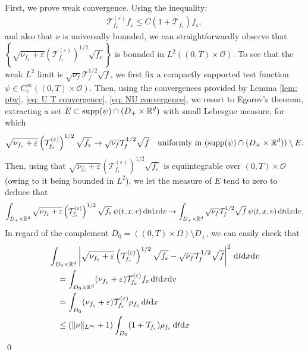 \documentclass[10pt, reqno]{amsart}
\theoremstyle{plain}
\theoremstyle{definition}
\theoremstyle{remark}
\renewenvironment{proof}[1][\proofname]{\noindent{\scshape #1.\quad}}{\qed}
\numberwithin{equation}{section}
\newcommand{\calO}{\mathcal O}
\newcommand{\calT}{\mathcal T}
\newcommand{\R}{\mathbb{R}}
\newcommand{\ve}{\varepsilon}
\newcommand{\dx}{\textnormal{d}x}
\newcommand{\dv}{\textnormal{d}v}
\newcommand{\dt}{\textnormal{d}t}
\newcommand{\lt}{\left}
\newcommand{\rt}{\right}
\begin{document}
\begin{proof}
    First, we prove weak convergence. Using the inequality:
    \begin{align*}
        \calT_{f_\ve}^{(\ve)} f_\ve \le C (1 + \calT_{f_\ve}) f_\ve,
    \end{align*}
    and also that $\nu$ is universally bounded, we can straightforwardly observe that $\lt\{ \sqrt{\nu_{f_\ve} + \ve}\lt(\calT_{f_\ve}^{(\ve)}\rt)^{1/2}\sqrt{f_\ve}\rt\}$ is bounded in $L^2((0,T)\times \calO)$. To see that the weak $L^2$ limit is $\sqrt{\nu_f}\calT_f^{1/2} \sqrt{f}$, we first fix a compactly supported test function $\psi \in C_c^\infty((0,T)\times \calO)$. Then, using the convergences provided by Lemma \ref{lem: ptw}, \eqref{eq: U T convergence}, \eqref{eq: NU convergence}, we resort to Egorov's theorem, extracting a set $E\subset \textnormal{supp}(\psi) \cap (D_+ \times \R^d)$ with small Lebesgue measure, for which 
    \begin{align*}
    \textnormal{$\sqrt{\nu_{f_\ve} + \ve}\lt(\calT_{f_\ve}^{(\ve)}\rt)^{1/2}\sqrt{f_\ve} \to \sqrt{\nu_f}\calT_f^{1/2} \sqrt{f}$\quad uniformly in $(\textnormal{supp}(\psi) \cap (D_+ \times \R^d) )\setminus E$.}
    \end{align*}
    Then, using that $\sqrt{\nu_{f_\ve}+\ve}\lt(\calT_{f_\ve}^{(\ve)}\rt)^{1/2}\sqrt{f_\ve}$ is equiintegrable over $(0,T)\times \calO$ (owing to it being bounded in $L^2$), we let the measure of $E$ tend to zero to deduce that
    \begin{align} \label{eq: sqrt dist}
        \int_{D_+ \times \R^d} \sqrt{\nu_{f_\ve} + \ve} \lt(\calT_{f_\ve}^{(\ve)}\rt)^{1/2}\sqrt{f_\ve} \, \psi(t,x,v) \,\dt\dx\dv \to \int_{D_+\times \R^d} \sqrt{\nu_f} \calT_f^{1/2} \sqrt{f} \,\psi(t,x,v) \,\dt\dx\dv.
    \end{align}
    In regard of the complement $D_0 = ((0,T)\times \Omega) \setminus D_+$, we can easily check that
    \begin{equation} \label{eq: sqrt D0}
    \begin{split}
        &\int_{D_0\times \R^d} \lt|\sqrt{\nu_{f_\ve} + \ve} \lt(\calT_{f_\ve}^{(\ve)}\rt)^{1/2} \sqrt{f_\ve} - \sqrt{\nu_f} \calT_f^{1/2} \sqrt{f} \rt|^2 \,\dt\dx\dv  \\
        &\quad= \int_{D_0 \times \R^d} (\nu_{f_\ve} + \ve) \calT_{f_\ve}^{(\ve)} f_\ve \,\dt\dx\dv\\
        &\quad= \int_{D_0} (\nu_{f_\ve} + \ve) \calT_{f_\ve}^{(\ve)} \rho_{f_\ve} \,\dt\dx \\
        &\quad\le (\|\nu\|_{L^\infty}+1) \int_{D_0} (1 + \calT_{f_\ve}) \rho_{f_\ve} \,\dt\dx \\

\end{split}
\end{equation}
\end{proof}
\end{document}
